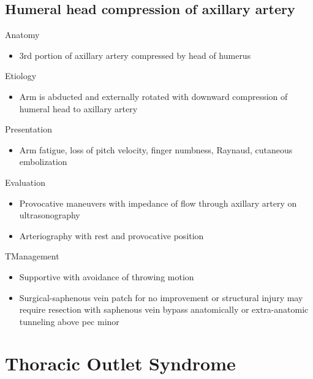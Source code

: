 \documentclass[
]{book}
\providecommand{\tightlist}{%
  \setlength{\itemsep}{0pt}\setlength{\parskip}{0pt}}
\begin{document}
\hypertarget{humeral-head-compression-of-axillary-artery}{%
\subsection{Humeral head compression of axillary artery}\label{humeral-head-compression-of-axillary-artery}}

Anatomy

\begin{itemize}
\tightlist
\item
  3rd portion of axillary artery compressed by head of humerus
\end{itemize}

Etiology

\begin{itemize}
\tightlist
\item
  Arm is abducted and externally rotated with downward compression of
  humeral head to axillary artery
\end{itemize}

Presentation

\begin{itemize}
\tightlist
\item
  Arm fatigue, loss of pitch velocity, finger numbness, Raynaud,
  cutaneous embolization
\end{itemize}

Evaluation

\begin{itemize}
\item
  Provocative maneuvers with impedance of flow through axillary artery
  on ultrasonography
\item
  Arteriography with rest and provocative position
\end{itemize}

TManagement

\begin{itemize}
\item
  Supportive with avoidance of throwing motion
\item
  Surgical-saphenous vein patch for no improvement or structural
  injury may require resection with saphenous vein bypass anatomically
  or extra-anatomic tunneling above pec minor
\end{itemize}

\hypertarget{thoracic-outlet-syndrome}{%
\section{Thoracic Outlet Syndrome}\label{thoracic-outlet-syndrome}}
\end{document}
